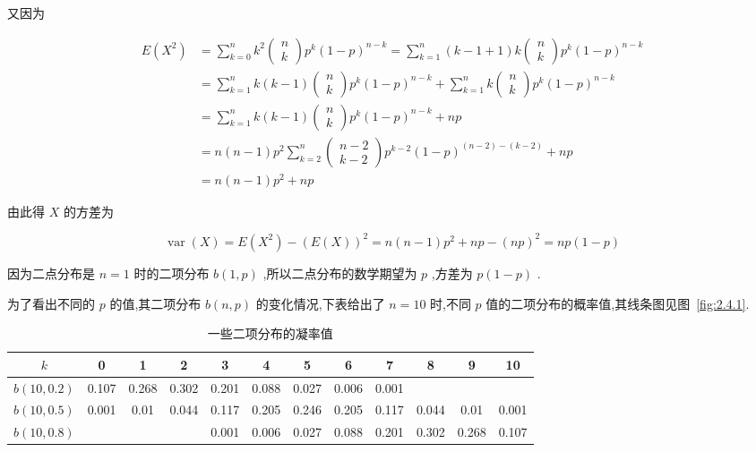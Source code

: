 又因为

\[
\begin{array}{ll}
{E\left(X^{2}\right)} & {=\sum_{k=0}^{n} k^{2} \left( 
	\begin{array}{c}
	{n} \\ 
	{k}
	\end{array}
	\right) 
	p^{k}(1-p)^{n-k}=\sum_{k=1}^{n}(k-1+1) k \left( 
	\begin{array}{c}{n} \\ 
	{k}
	\end{array}
	\right) 
	p^{k}(1-p)^{n-k}} \\ 
{}&{=\sum_{k=1}^{n} k(k-1) \left( 
	\begin{array}{c}{n} \\ 
	{k}
	\end{array}
	\right) 
	p^{k}(1-p)^{n-k}+\sum_{k=1}^{n} k \left( 
	\begin{array}{c}{n} \\ 
	{k}
	\end{array}
	\right) 
	p^{k}(1-p)^{n-k}} \\ 
{}&{=\sum_{k=1}^{n} k(k-1) \left( 
	\begin{array}{c}{n} \\ 
	{k}
	\end{array}
	\right) 
	p^{k}(1-p)^{n-k}+n p} \\ 
{}&{=n(n-1) p^{2} \sum_{k=2}^{n} \left( 
	\begin{array}{c}{n-2} \\ 
	{k-2}
	\end{array}
	\right) 
	p^{k-2}(1-p)^{(n-2)-(k-2)}+n p} \\ 
{}&{=n(n-1) p^{2}+n p}
\end{array}
\]

由此得 $ X $ 的方差为

\[
\operatorname{var}(X)=E\left(X^{2}\right)-(E(X))^{2}=n(n-1) p^{2}+n p-(n p)^{2}=n p(1-p)
\]

因为二点分布是 $ n=1 $ 时的二项分布 $ b(1,p) $ ,所以二点分布的数学期望为 $ p $ ,方差为 $ p(1-p) $ .

为了看出不同的 $ p $ 的值,其二项分布 $ b(n,p) $ 的变化情况,下表给出了 $ n=10 $ 时,不同 $ p $ 值的二项分布的概率值,其线条图见图~\ref{fig:2.4.1}.

\begin{table}[htbp]
	\centering
	\caption{一些二项分布的凝率值}
	\begin{tabular}{c|ccccccccccc}
		\toprule
		 $ k $ & 0     & 1     & 2     & 3     & 4     & 5     & 6     & 7     & 8     & 9     & 10 \\\midrule
		 $ b(10,0.2) $ & 0.107 & 0.268 & 0.302 & 0.201 & 0.088 & 0.027 & 0.006 & 0.001 &       &       &  \\
		 $ b(10,0.5) $ & 0.001 & 0.01  & 0.044 & 0.117 & 0.205 & 0.246 & 0.205 & 0.117 & 0.044 & 0.01  & 0.001 \\
		 $ b(10,0.8) $ &       &       &       & 0.001 & 0.006 & 0.027 & 0.088 & 0.201 & 0.302 & 0.268 & 0.107 \\\bottomrule
	\end{tabular}%
	\label{tab:2.4.1}%
\end{table}%

